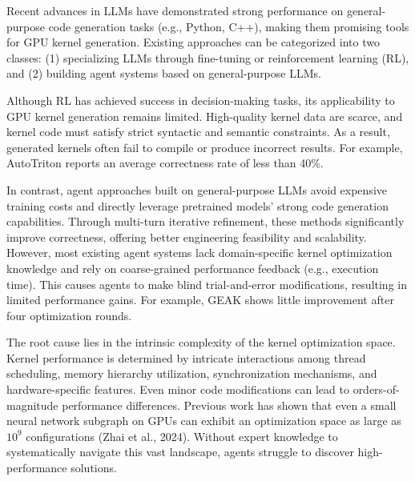\documentclass{article}
\theoremstyle{plain}
\theoremstyle{definition}
\theoremstyle{remark}
\begin{document}
Recent advances in LLMs have demonstrated strong performance on general-purpose code generation tasks (e.g., Python, C++), making them promising tools for GPU kernel generation. Existing approaches can be categorized into two classes: (1) specializing LLMs through fine-tuning or reinforcement learning (RL), and (2) building agent systems based on general-purpose LLMs.

Although RL has achieved success in decision-making tasks, its applicability to GPU kernel generation remains limited. High-quality kernel data are scarce, and kernel code must satisfy strict syntactic and semantic constraints. As a result, generated kernels often fail to compile or produce incorrect results. For example, AutoTriton reports an average correctness rate of less than 40\%.

In contrast, agent approaches built on general-purpose LLMs avoid expensive training costs and directly leverage pretrained models' strong code generation capabilities. Through multi-turn iterative refinement, these methods significantly improve correctness, offering better engineering feasibility and scalability. However, most existing agent systems lack domain-specific kernel optimization knowledge and rely on coarse-grained performance feedback (e.g., execution time). This causes agents to make blind trial-and-error modifications, resulting in limited performance gains. For example, GEAK shows little improvement after four optimization rounds.

The root cause lies in the intrinsic complexity of the kernel optimization space. Kernel performance is determined by intricate interactions among thread scheduling, memory hierarchy utilization, synchronization mechanisms, and hardware-specific features. Even minor code modifications can lead to orders-of-magnitude performance differences. Previous work has shown that even a small neural network subgraph on GPUs can exhibit an optimization space as large as $10^9$ configurations (Zhai et al., 2024). Without expert knowledge to systematically navigate this vast landscape, agents struggle to discover high-performance solutions.
\end{document}
